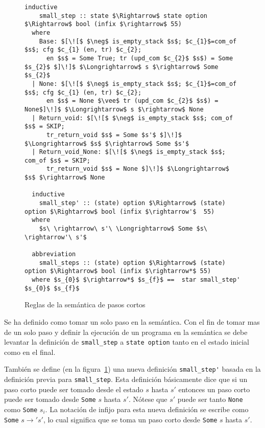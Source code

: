 \begin{figure}
  \begin{lstlisting}[frame=single, mathescape=true]
  inductive
    small_step :: state $\Rightarrow$ state option $\Rightarrow$ bool (infix $\rightarrow$ 55)
  where
    Base: $[\![$ $\neg$ is_empty_stack $s$; $c_{1}$=com_of $s$; cfg $c_{1} (en, tr) $c_{2};
      en $s$ = Some True; tr (upd_com $c_{2}$ $s$) = Some $s_{2}$ $]\!]$ $\Longrightarrow$ s $\rightarrow$ Some $s_{2}$
  | None: $[\![$ $\neg$ is_empty_stack $s$; $c_{1}$=com_of $s$; cfg $c_{1} (en, tr) $c_{2};
      en $s$ = None $\vee$ tr (upd_com $c_{2}$ $s$) = None$]\!]$ $\Longrightarrow$ s $\rightarrow$ None
  | Return_void: $[\![$ $\neg$ is_empty_stack $s$; com_of $s$ = SKIP;
      tr_return_void $s$ = Some $s'$ $]\!]$ $\Longrightarrow$ $s$ $\rightarrow$ Some $s'$
  | Return_void_None: $[\![$ $\neg$ is_empty_stack $s$; com_of $s$ = SKIP;
      tr_return_void $s$ = None $]\!]$ $\Longrightarrow$ $s$ $\rightarrow$ None

  inductive
    small_step' :: (state) option $\Rightarrow$ (state) option $\Rightarrow$ bool (infix $\rightarrow'$  55)
  where
    $s\ \rightarrow\ s'\ \Longrightarrow$ Some $s\ \rightarrow'\ s'$

  abbreviation
    small_steps :: (state) option $\Rightarrow$ (state) option $\Rightarrow$ bool (infix $\rightarrow*$ 55)
  where $s_{0}$ $\rightarrow*$ $s_{f}$ ==  star small_step' $s_{0}$ $s_{f}$
  \end{lstlisting}

  \caption{Reglas de la semántica de pasos cortos}
  \label{fig:small_step_rules}
\end{figure}

Se ha definido como tomar un solo paso en la semántica.
Con el fin de tomar mas de un solo paso y definir la ejecución de un programa en la semántica se debe levantar la definición de \verb|small_step| a \verb|state option| tanto en el estado inicial como en el final.

También se define (en la figura~\ref{fig:small_step_rules}) una nueva definición \verb|small_step'| basada en la definición previa para \verb|small_step|.
Esta definición básicamente dice que si un paso corto puede ser tomado desde el estado $s$ hasta $s'$ entonces un paso corto puede ser tomado desde \verb|Some| $s$ hasta $s'$.
Nótese que $s'$ puede ser tanto \verb|None| como \verb|Some| $s_{i}$.
La notación de infijo para esta nueva definición se escribe como \verb|Some| $s \rightarrow' s'$, lo cual significa que se toma un paso corto desde \verb|Some| $s$ hasta $s'$.

